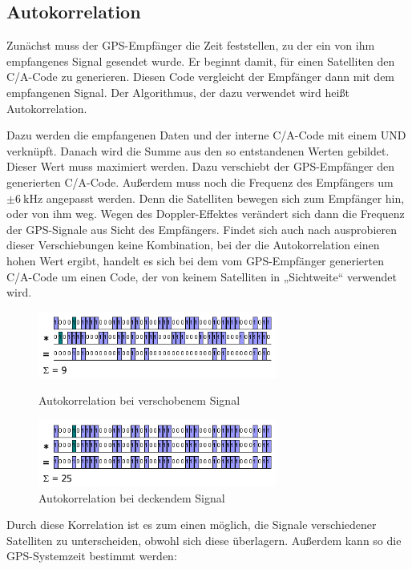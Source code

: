 \documentclass[12pt,a4paper]{scrartcl}
\begin{document}
\subsection{Autokorrelation}
Zunächst muss der GPS-Empfänger die Zeit feststellen, zu der ein von ihm empfangenes Signal gesendet wurde. Er beginnt damit, für einen Satelliten den C/A-Code zu generieren. Diesen Code vergleicht der Empfänger dann mit dem empfangenen Signal. Der Algorithmus, der dazu verwendet wird heißt Autokorrelation.

Dazu werden die empfangenen Daten und der interne C/A-Code mit einem UND verknüpft. Danach wird die Summe aus den so entstandenen Werten gebildet. Dieser Wert muss maximiert werden. Dazu verschiebt der GPS-Empfänger den generierten C/A-Code. Außerdem muss noch die Frequenz des Empfängers um $\pm \SI{6}{\kilo\hertz}$ angepasst werden. Denn die Satelliten bewegen sich zum Empfänger hin, oder von ihm weg. Wegen des Doppler-Effektes verändert sich dann die Frequenz der GPS-Signale aus Sicht des Empfängers. Findet sich auch nach ausprobieren dieser Verschiebungen keine Kombination, bei der die Autokorrelation einen hohen Wert ergibt, handelt es sich bei dem vom GPS-Empfänger generierten C/A-Code um einen Code, der von keinem Satelliten in „Sichtweite“ verwendet wird.

\begin{figure}[H]
\centering
\includegraphics[width=0.7\textwidth]{img/ac_9.png}
\caption{Autokorrelation bei verschobenem Signal\cite{kowoma_signalv}}
\includegraphics[width=0.7\textwidth]{img/ac_25.png}
\caption{Autokorrelation bei deckendem Signal\cite{kowoma_signalv}}
\label{fig:ac}
\end{figure}

Durch diese Korrelation ist es zum einen möglich, die Signale verschiedener Satelliten zu unterscheiden, obwohl sich diese überlagern. Außerdem kann so die GPS-Systemzeit bestimmt werden:
\end{document}
